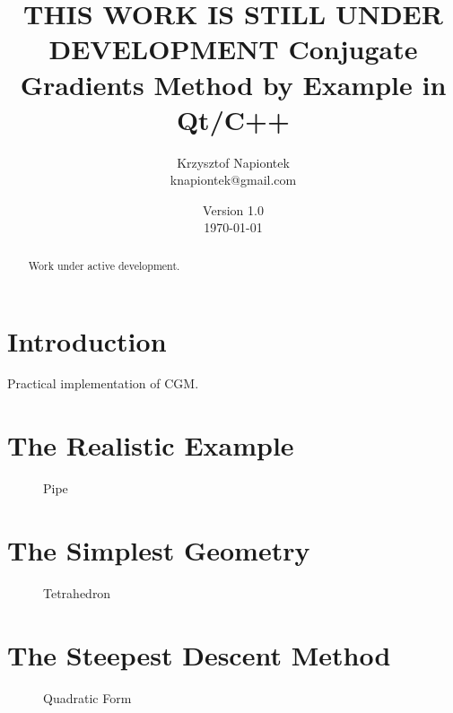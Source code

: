 


\title{THIS WORK IS STILL UNDER DEVELOPMENT Conjugate Gradients Method by Example in Qt/C++}
\author{Krzysztof Napiontek\protect\\knapiontek@gmail.com}
\date{Version 1.0\protect\\\today}



\maketitle

\begin{abstract}

Work under active development.

\end{abstract}

\tableofcontents

\section{Introduction}

Practical implementation of CGM.

\section{The Realistic Example}

\begin{figure}[H]
\centering

\caption{Pipe}
\label{fig:pipe}
\end{figure}

\section{The Simplest Geometry}

\begin{figure}[H]
\centering

\caption{Tetrahedron}
\label{fig:tetrahedron}
\end{figure}

\section{The Steepest Descent Method}

\begin{figure}[H]
\centering

\caption{Quadratic Form}
\label{fig:quadratic-form}
\end{figure}

